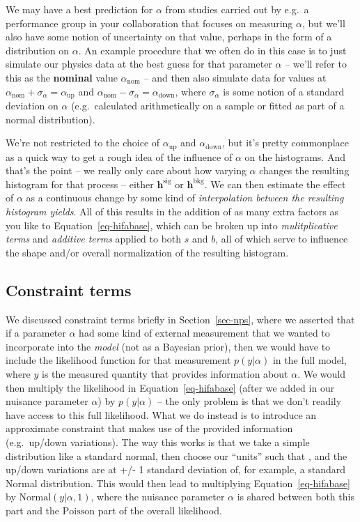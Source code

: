 \documentclass[
  11pt,
  numbers=noendperiod]{book}
\begin{document}
We may have a best prediction for \(\alpha\) from studies carried out by
e.g.~a performance group in your collaboration that focuses on measuring
\(\alpha\), but we'll also have some notion of uncertainty on that
value, perhaps in the form of a distribution on \(\alpha\). An example
procedure that we often do in this case is to just simulate our physics
data at the best guess for that parameter \(\alpha\) -- we'll refer to
this as the \textbf{nominal} value \(\alpha_{\mathrm{nom}}\) -- and then
also simulate data for values at
\(\alpha_{\mathrm{nom}}+\sigma_{\alpha} = \alpha_{\mathrm{up}}\) and
\(\alpha_{\mathrm{nom}}-\sigma_{\alpha} = \alpha_{\mathrm{down}}\),
where \(\sigma_{\alpha}\) is some notion of a standard deviation on
\(\alpha\) (e.g.~calculated arithmetically on a sample or fitted as part
of a normal distribution).

We're not restricted to the choice of \(\alpha_{\mathrm{up}}\) and
\(\alpha_{\mathrm{down}}\), but it's pretty commonplace as a quick way
to get a rough idea of the influence of \(\alpha\) on the histograms.
And that's the point -- we really only care about how varying \(\alpha\)
changes the resulting histogram for that process -- either
\(\mathbf{h}^{\mathrm{sig}}\) or \(\mathbf{h}^{\mathrm{bkg}}\). We can
then estimate the effect of \(\alpha\) as a continuous change by some
kind of \emph{interpolation between the resulting histogram yields}. All
of this results in the addition of as many extra factors as you like to
Equation~\ref{eq-hifabase}, which can be broken up into
\emph{mulitplicative terms} and \emph{additive terms} applied to both
\(s\) and \(b\), all of which serve to influence the shape and/or
overall normalization of the resulting histogram.

\hypertarget{constraint-terms}{%
\subsection{Constraint terms}\label{constraint-terms}}

We discussed constraint terms briefly in Section~\ref{sec-nps}, where we
asserted that if a parameter \(\alpha\) had some kind of external
measurement that we wanted to incorporate into the \emph{model} (not as
a Bayesian prior), then we would have to include the likelihood function
for that measurement \(p(y|\alpha)\) in the full model, where \(y\) is
the measured quantity that provides information about \(\alpha\). We
would then multiply the likelihood in Equation~\ref{eq-hifabase} (after
we added in our nuisance parameter \(\alpha\)) by \(p(y|\alpha)\) -- the
only problem is that we don't readily have access to this full
likelihood. What we do instead is to introduce an approximate constraint
that makes use of the provided information (e.g.~up/down variations).
The way this works is that we take a simple distribution like a standard
normal, then choose our ``units'' such that , and the up/down variations
are at +/- 1 standard deviation of, for example, a standard Normal
distribution. This would then lead to multiplying
Equation~\ref{eq-hifabase} by \(\mathrm{Normal}(y | \alpha , 1)\), where
the nuisance parameter \(\alpha\) is shared between both this part and
the \(\mathrm{Poisson}\) part of the overall likelihood.
\end{document}
